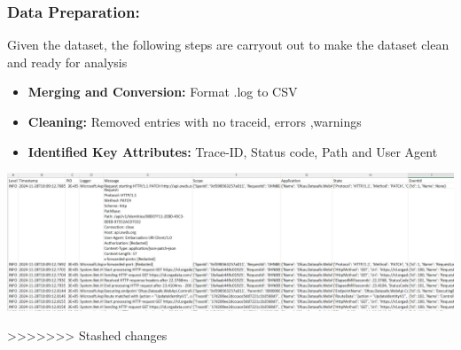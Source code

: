 \documentclass[10pt, a4paper]{beamer}
\begin{document}
	
	\begin{frame}
		\frametitle{Data Preparation:} 
		Given the dataset, the following steps are carryout out to make the dataset clean and ready for analysis
		\begin{block}{}
			\begin{itemize}
				\item \textbf{Merging and Conversion:} Format .log to CSV
				\item \textbf{Cleaning:} Removed entries with no traceid, errors ,warnings
				\item \textbf{Identified Key Attributes:} Trace-ID, Status code, Path and User Agent
			\end{itemize}
		\end{block}
		
		
		\centering
		\includegraphics[width=1\textwidth]{images/csvFIle.png} %
		
		\vskip 0.1cm %
		\centering
		
	\end{frame}
	
>>>>>>> Stashed changes
	
\end{document}
